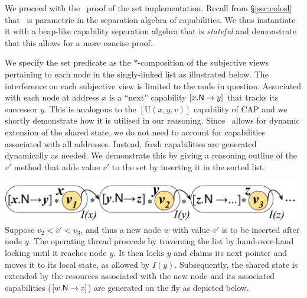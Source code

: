 We proceed with the \colosl\ proof of the set implementation. Recall from \S\ref{sec:colosl} that \colosl\ is parametric in the separation algebra of capabilities. We thus instantiate it with a heap-like capability separation algebra that is \emph{stateful} and demonstrate that this allows for a more concise proof.  

We specify the set predicate as the $*$-composition of the subjective views pertaining to each node in the singly-linked list as illustrated below. The interference on each subjective view is limited to the node in question. Associated with each node at address $x$ is a ``next'' capability $[\nextC{x}{y}]$ that tracks its successor $y$. This is analogous to the $[\text{U}(x, y, v)]$ capability of CAP and we shortly demonstrate how it is utilised in our reasoning. Since \colosl\ allows for {dynamic} extension of the shared state, we do not need to account for capabilities associated with all addresses. Instead, fresh capabilities are generated dynamically as needed. We demonstrate this by giving a reasoning outline of the $v'$\li{)} method that adds value $v'$ to the set by inserting it in the sorted list. 

%
{\centering \includegraphics[scale=0.25]{Sections/Examples/Images/coloslSet.pdf}\\}
%
\noindent Suppose $v_2 < v' < v_3$, and thus a new node $w$ with value $v'$ is to be inserted after node $y$.  The operating thread proceeds by traversing the list by hand-over-hand locking until it reaches node $y$. It then locks $y$ and claims its next pointer and moves it to its local state, as allowed by $I(y)$. Subsequently, the shared state is {extended} by the resources associated with the new node and its associated capabilities ($[\nextC{w}{z}]$) are generated on the fly as depicted below. \vspace{0pt}

